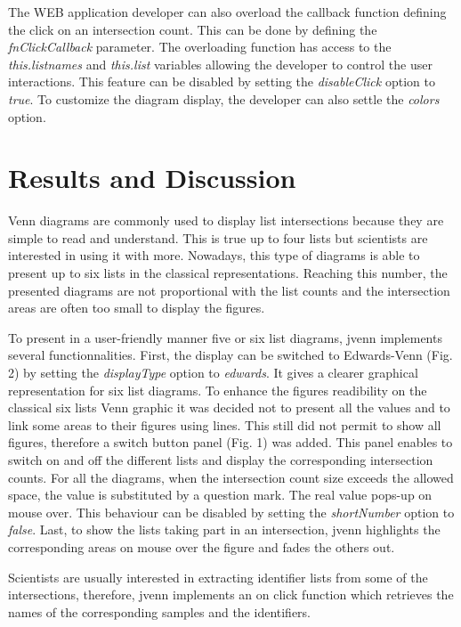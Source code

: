 \documentclass{bmcart}
\begin{document}
The WEB application developer can also overload the callback function defining the click on an intersection count. This can be done by defining 
the \textit{fnClickCallback} parameter. The overloading function has access to the \textit{this.listnames} and \textit{this.list} variables 
allowing the developer to control the user interactions. This feature can be disabled by setting the \textit{disableClick} option to \textit{true}. 
To customize the diagram display, the developer can also settle the \textit{colors} option.


\section*{Results and Discussion}

Venn diagrams are commonly used to display list intersections because they are simple to read and understand. This is true up to four lists but 
scientists are interested in using it with more. Nowadays, this type of diagrams is able to present up to six lists in the classical representations.
Reaching this number, the presented diagrams are not proportional with the list counts and the intersection areas are often too small to display the 
figures. 

To present in a user-friendly manner five or six list diagrams, jvenn implements several functionnalities. First, the display can be switched to
Edwards-Venn (Fig. 2) by setting the \textit{displayType} option to \textit{edwards}. It gives a clearer graphical representation for six list
diagrams. To enhance the figures readibility on the classical six lists Venn graphic it was decided not to present all the values and to link some areas
to their figures using lines. This still did not permit to show all figures, therefore a switch button panel (Fig. 1) was added. This panel enables 
to switch on and off the different lists and display the corresponding intersection counts. For all the diagrams, when the intersection count size 
exceeds the allowed space, the value is substituted by a question mark. The real value pops-up on mouse over. This behaviour can be disabled by setting 
the \textit{shortNumber} option to \textit{false}. Last, to show the lists taking part in an intersection, jvenn highlights the corresponding areas on
mouse over the figure and fades the others out.

Scientists are usually interested in extracting identifier lists from some of the intersections, therefore, jvenn implements an on click function which 
retrieves the names of the corresponding samples and the identifiers.
\end{document}
